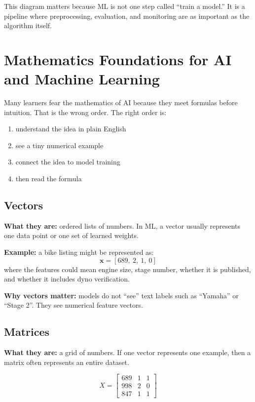 \documentclass[12pt, a4paper, oneside]{book}
\begin{document}
This diagram matters because ML is not one step called ``train a model.'' It is a pipeline where preprocessing, evaluation, and monitoring are as important as the algorithm itself.

\section{Mathematics Foundations for AI and Machine Learning}

Many learners fear the mathematics of AI because they meet formulas before intuition. That is the wrong order. The right order is:

\begin{enumerate}[leftmargin=2em]
    \item understand the idea in plain English
    \item see a tiny numerical example
    \item connect the idea to model training
    \item then read the formula
\end{enumerate}

\subsection{Vectors}

\textbf{What they are:} ordered lists of numbers. In ML, a vector usually represents one data point or one set of learned weights.

\textbf{Example:} a bike listing might be represented as:
\[
\mathbf{x} = [689,\ 2,\ 1,\ 0]
\]
where the features could mean engine size, stage number, whether it is published, and whether it includes dyno verification.

\textbf{Why vectors matter:} models do not ``see'' text labels such as ``Yamaha'' or ``Stage 2''. They see numerical feature vectors.

\subsection{Matrices}

\textbf{What they are:} a grid of numbers. If one vector represents one example, then a matrix often represents an entire dataset.

\[
X =
\begin{bmatrix}
689 & 1 & 1 \\
998 & 2 & 0 \\
847 & 1 & 1
\end{bmatrix}
\]
\end{document}
